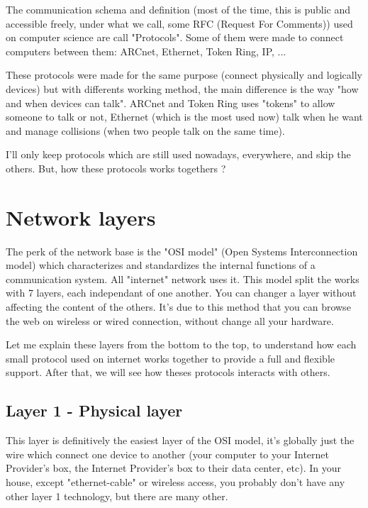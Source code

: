 \documentclass{article}
\begin{document}
	The communication schema and definition (most of the time, this is public and accessible freely, under what we
	call, some RFC (Request For Comments)) used on computer science are call "Protocols".
	Some of them were made to connect computers between them: ARCnet, Ethernet, Token Ring, IP, ...
	
	These protocols were made for the same purpose (connect physically and logically devices) but with differents
	working method, the main difference is the way "how and when devices can talk".
	ARCnet and Token Ring uses "tokens" to allow someone to talk or not, Ethernet (which is the most used now)
	talk when he want and manage collisions (when two people talk on the same time).
	
	I'll only keep protocols which are still used nowadays, everywhere, and skip the others.
	But, how these protocols works togethers ?

\section{Network layers}

	The perk of the network base is the "OSI model" (Open Systems Interconnection model) which characterizes and
	standardizes the internal functions of a communication system. All "internet" network uses it. This model split
	the works with 7 layers, each independant of one another. You can changer a layer without affecting the content
	of the others. It's due to this method that you can browse the web on wireless or wired connection, without change
	all your hardware.
	
	Let me explain these layers from the bottom to the top, to understand how each small protocol used on internet
	works together to provide a full and flexible support. After that, we will see how theses protocols interacts
	with others.
	
	\subsection{Layer 1 - Physical layer}
	
	This layer is definitively the easiest layer of the OSI model, it's globally just the wire which connect one
	device to another (your computer to your Internet Provider's box, the Internet Provider's box to their
	data center, etc). In your house, except "ethernet-cable" or wireless access, you probably don't have
	any other layer 1 technology, but there are many other.
	
\end{document}
